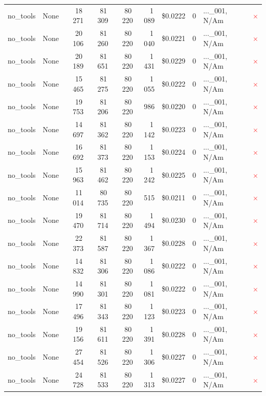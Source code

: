 \documentclass[a4paper,11pt]{article}
\begin{document}
\begin{table}[H]
{\begin{tabular}{l r r r r r r r l c}
no\_tools & None & 18\,271 & 81\,309 & 80\,220 & 1\,089 & \$0.0222 & 0 & ...\_001, N/Am & \textcolor{red}{\(\times\)} \\
no\_tools & None & 20\,106 & 81\,260 & 80\,220 & 1\,040 & \$0.0221 & 0 & ...\_001, N/Am & \textcolor{red}{\(\times\)} \\
no\_tools & None & 20\,189 & 81\,651 & 80\,220 & 1\,431 & \$0.0229 & 0 & ...\_001, N/Am & \textcolor{red}{\(\times\)} \\
no\_tools & None & 15\,465 & 81\,275 & 80\,220 & 1\,055 & \$0.0222 & 0 & ...\_001, N/Am & \textcolor{red}{\(\times\)} \\
no\_tools & None & 19\,753 & 81\,206 & 80\,220 & 986 & \$0.0220 & 0 & ...\_001, N/Am & \textcolor{red}{\(\times\)} \\
no\_tools & None & 14\,697 & 81\,362 & 80\,220 & 1\,142 & \$0.0223 & 0 & ...\_001, N/Am & \textcolor{red}{\(\times\)} \\
no\_tools & None & 16\,692 & 81\,373 & 80\,220 & 1\,153 & \$0.0224 & 0 & ...\_001, N/Am & \textcolor{red}{\(\times\)} \\
no\_tools & None & 15\,963 & 81\,462 & 80\,220 & 1\,242 & \$0.0225 & 0 & ...\_001, N/Am & \textcolor{red}{\(\times\)} \\
no\_tools & None & 11\,014 & 80\,735 & 80\,220 & 515 & \$0.0211 & 0 & ...\_001, N/Am & \textcolor{red}{\(\times\)} \\
no\_tools & None & 19\,470 & 81\,714 & 80\,220 & 1\,494 & \$0.0230 & 0 & ...\_001, N/Am & \textcolor{red}{\(\times\)} \\
no\_tools & None & 22\,373 & 81\,587 & 80\,220 & 1\,367 & \$0.0228 & 0 & ...\_001, N/Am & \textcolor{red}{\(\times\)} \\
no\_tools & None & 14\,832 & 81\,306 & 80\,220 & 1\,086 & \$0.0222 & 0 & ...\_001, N/Am & \textcolor{red}{\(\times\)} \\
no\_tools & None & 14\,990 & 81\,301 & 80\,220 & 1\,081 & \$0.0222 & 0 & ...\_001, N/Am & \textcolor{red}{\(\times\)} \\
no\_tools & None & 17\,496 & 81\,343 & 80\,220 & 1\,123 & \$0.0223 & 0 & ...\_001, N/Am & \textcolor{red}{\(\times\)} \\
no\_tools & None & 19\,156 & 81\,611 & 80\,220 & 1\,391 & \$0.0228 & 0 & ...\_001, N/Am & \textcolor{red}{\(\times\)} \\
no\_tools & None & 27\,454 & 81\,526 & 80\,220 & 1\,306 & \$0.0227 & 0 & ...\_001, N/Am & \textcolor{red}{\(\times\)} \\
no\_tools & None & 24\,728 & 81\,533 & 80\,220 & 1\,313 & \$0.0227 & 0 & ...\_001, N/Am & \textcolor{red}{\(\times\)} \\

\end{tabular}}
\end{table}
\end{document}
